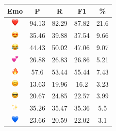 \documentclass{article}
\begin{document}
\begin{table}
\centering
\begin{tabular}{|c|ccc|c|} \hline
\textbf{Emo} & \textbf{P} & \textbf{R} & \textbf{F1} & \textbf{\%} \\ \hline
\includegraphics[height=0.37cm,width=0.37cm]{img/red_heart.png} & 94.13 & 82.29 & 87.82 & 21.6\\ 
\includegraphics[height=0.37cm,width=0.37cm]{img/smiling_face_with_hearteyes.png} & 35.46 & 39.88 & 37.54 & 9.66\\ 
\includegraphics[height=0.37cm,width=0.37cm]{img/face_with_tears_of_joy.png} & 44.43 & 50.02 & 47.06 & 9.07\\ 
\includegraphics[height=0.37cm,width=0.37cm]{img/two_hearts.png} & 26.88 & 26.83 & 26.86 & 5.21\\ 
\includegraphics[height=0.37cm,width=0.37cm]{img/fire.png} & 57.6 & 53.44 & 55.44 & 7.43\\ 
\includegraphics[height=0.37cm,width=0.37cm]{img/smiling_face_with_smiling_eyes.png} & 13.63 & 19.96 & 16.2 & 3.23\\ 
\includegraphics[height=0.37cm,width=0.37cm]{img/smiling_face_with_sunglasses.png} & 20.67 & 24.85 & 22.57 & 3.99\\ 
\includegraphics[height=0.37cm,width=0.37cm]{img/sparkles.png} & 35.26 & 35.47 & 35.36 & 5.5\\ 
\includegraphics[height=0.37cm,width=0.37cm]{img/blue_heart.png} & 23.66 & 20.59 & 22.02 & 3.1\\ 

\end{tabular}
\end{table}
\end{document}
